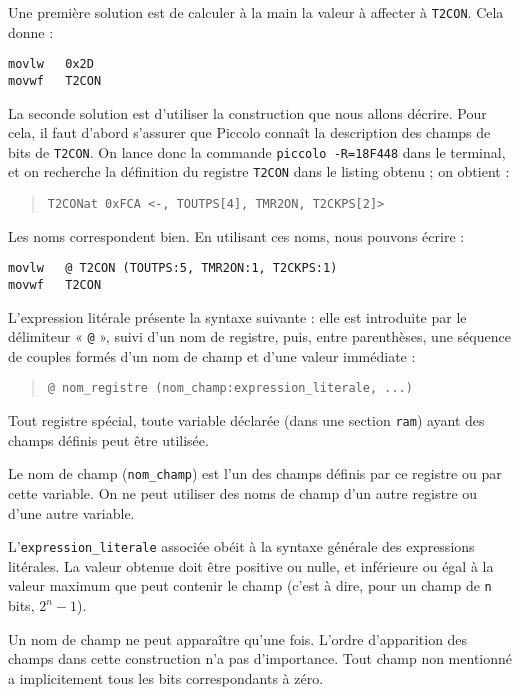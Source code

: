Une première solution est de calculer à la main la valeur à affecter à \texttt{T2CON}. Cela donne :
\begin{lstlisting}[language=piccolo]
movlw   0x2D
movwf   T2CON
\end{lstlisting}

La seconde solution est d'utiliser la construction que nous allons décrire. Pour cela, il faut d'abord s’assurer que Piccolo connaît la description des champs de bits de \texttt{T2CON}. On lance donc la commande \texttt{piccolo -R=18F448} dans le terminal, et on recherche la définition du registre \texttt{T2CON} dans le listing obtenu ; on obtient :
\begin{quote}
\texttt{\textquotesingle T2CON\textquotesingle at 0xFCA <-, TOUTPS[4], TMR2ON, T2CKPS[2]>}
\end{quote}

Les noms correspondent bien. En utilisant ces noms, nous pouvons écrire :
\begin{lstlisting}[language=piccolo]
movlw   @ T2CON (TOUTPS:5, TMR2ON:1, T2CKPS:1)
movwf   T2CON
\end{lstlisting}

L'expression litérale présente la syntaxe suivante : elle est introduite par le délimiteur « \texttt{@} », suivi d’un nom de registre, puis, entre parenthèses, une séquence de couples formés d’un nom de champ et d’une valeur immédiate :
\begin{quote}
\texttt{@ nom\_registre (nom\_champ:expression\_literale, ...)}
\end{quote}

Tout registre spécial, toute variable déclarée (dans une section \texttt{ram}) ayant des champs définis peut être utilisée.

Le nom de champ (\texttt{nom\_champ}) est l’un des champs définis par ce registre ou par cette variable. On ne peut utiliser des noms de champ d’un autre registre ou d’une autre variable.

L’\texttt{expression\_literale} associée obéit à la syntaxe générale des expressions litérales. La valeur obtenue doit être positive ou nulle, et inférieure ou égal à la valeur maximum que peut contenir le champ (c’est à dire, pour un champ de \texttt{n} bits, $2^n-1$).

Un nom de champ ne peut apparaître qu’une fois. L’ordre d’apparition des champs dans cette construction n’a pas d’importance. Tout champ non mentionné a implicitement tous les bits correspondants à zéro.


